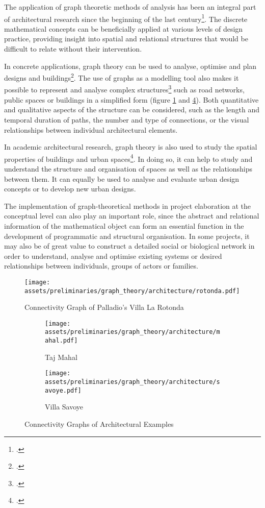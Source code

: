 \documentclass[a4paper, 12pt]{report}
\begin{document}
The application of graph theoretic methods of analysis has been an integral part of architectural research since the beginning of the last century\footcite{earl1979architectural}. The discrete mathematical concepts can be beneficially applied at various levels of design practice, providing insight into spatial and relational structures that would be difficult to relate without their intervention.

In concrete applications, graph theory can be used to analyse, optimise and plan designs and buildings\footcite{dawes2013applications}. The use of graphs as a modelling tool also makes it possible to represent and analyse complex structures\footcite{lakshmi2017graph} such as road networks, public spaces or buildings in a simplified form (figure \ref{fig:la-rotonda} and \ref{fig:connectivity-graphs-for-architectural-examples}). Both quantitative and qualitative aspects of the structure can be considered, such as the length and temporal duration of paths, the number and type of connections, or the visual relationships between individual architectural elements.

In academic architectural research, graph theory is also used to study the spatial properties of buildings and urban spaces\footcite{napong2004graph}. In doing so, it can help to study and understand the structure and organisation of spaces as well as the relationships between them. It can equally be used to analyse and evaluate urban design concepts or to develop new urban designs.

The implementation of graph-theoretical methods in project elaboration at the conceptual level can also play an important role, since the abstract and relational information of the mathematical object can form an essential function in the development of programmatic and structural organisation. In some projects, it may also be of great value to construct a detailed social or biological network in order to understand, analyse and optimise existing systems or desired relationships between individuals, groups of actors or families.

\begin{figure}
\centering
\texttt{[image: assets/preliminaries/graph\_theory/architecture/rotonda.pdf]}
\caption{Connectivity Graph of Palladio's Villa La Rotonda}
\label{fig:la-rotonda}
\end{figure}

\begin{figure}
\centering
\begin{subfigure}{.5\textwidth}
\centering
\texttt{[image: assets/preliminaries/graph\_theory/architecture/mahal.pdf]}
\caption{Taj Mahal}
\label{fig:taj-mahal}
\end{subfigure}%
\begin{subfigure}{.5\textwidth}
\centering
\texttt{[image: assets/preliminaries/graph\_theory/architecture/savoye.pdf]}
\caption{Villa Savoye}
\label{fig:villa-savoye}
\end{subfigure}
\caption{Connectivity Graphs of Architectural Examples}
\label{fig:connectivity-graphs-for-architectural-examples}
\end{figure}
\end{document}
